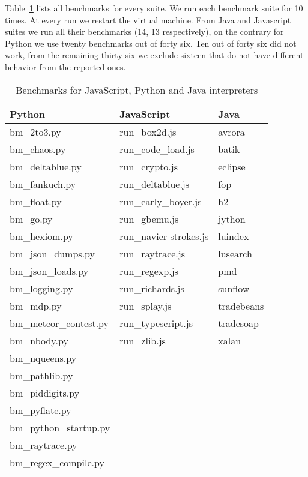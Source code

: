 \documentclass[parskip=full, paper=a4, fontsize=12pt]{scrartcl}
\numberwithin{equation}{section}
\numberwithin{figure}{section}
\numberwithin{table}{section}
\begin{document}
Table~\ref{tab:benchmarks} lists all benchmarks for every suite. We run each benchmark suite for 10 times. At every run we restart the virtual machine. From Java and Javascript suites we run all their benchmarks (14, 13 respectively), on the contrary for Python we use twenty benchmarks out of forty six. Ten out of forty six did not work, from the remaining thirty six we exclude sixteen that do not have different behavior from the reported ones.

\begin{table}
\centering
    \begin{tabular}{|l|l|l|}
        \hline
        \textbf{Python}         &\textbf{JavaScript}        &\textbf{Java} \\
        \hline
        bm\_2to3.py             &run\_box2d.js              &avrora     \\
        bm\_chaos.py            &run\_code\_load.js         &batik      \\
        bm\_deltablue.py        &run\_crypto.js             &eclipse    \\
        bm\_fankuch.py          &run\_deltablue.js          &fop        \\
        bm\_float.py            &run\_early\_boyer.js       &h2         \\
        bm\_go.py               &run\_gbemu.js              &jython     \\
        bm\_hexiom.py           &run\_navier-strokes.js     &luindex    \\
        bm\_json\_dumps.py      &run\_raytrace.js           &lusearch   \\
        bm\_json\_loads.py      &run\_regexp.js             &pmd        \\
        bm\_logging.py          &run\_richards.js           &sunflow    \\
        bm\_mdp.py              &run\_splay.js              &tradebeans \\
        bm\_meteor\_contest.py  &run\_typescript.js         &tradesoap  \\
        bm\_nbody.py            &run\_zlib.js               &xalan      \\
        bm\_nqueens.py          &                           &           \\
        bm\_pathlib.py          &                           &           \\
        bm\_piddigits.py        &                           &           \\
        bm\_pyflate.py          &                           &           \\
        bm\_python\_startup.py  &                           &           \\
        bm\_raytrace.py         &                           &           \\
        bm\_regex\_compile.py   &                           &           \\
        \hline
    \end{tabular}
    \caption{Benchmarks for JavaScript, Python and Java interpreters}
    \label{tab:benchmarks}
\end{table}
\end{document}
